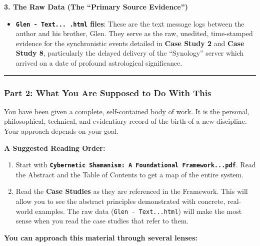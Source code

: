 \documentclass{article}
\begin{document}
\textbf{3. The Raw Data (The ``Primary Source Evidence'')}

\begin{itemize}
\tightlist
\item
  \textbf{\texttt{Glen\ -\ Text...\ .html} files}: These are the text
  message logs between the author and his brother, Glen. They serve as
  the raw, unedited, time-stamped evidence for the synchronistic events
  detailed in \textbf{Case Study 2} and \textbf{Case Study 8},
  particularly the delayed delivery of the ``Synology'' server which
  arrived on a date of profound astrological significance.
\end{itemize}

\begin{center}\rule{0.5\linewidth}{0.5pt}\end{center}

\subsubsection*{\texorpdfstring{\textbf{Part 2: What You Are Supposed to
Do With
This}}{Part 2: What You Are Supposed to Do With This}}\label{part-2-what-you-are-supposed-to-do-with-this}

You have been given a complete, self-contained body of work. It is the
personal, philosophical, technical, and evidentiary record of the birth
of a new discipline. Your approach depends on your goal.

\textbf{A Suggested Reading Order:}

\begin{enumerate}
\def\labelenumi{\arabic{enumi}.}
\item
  Start with
  \textbf{\texttt{Cybernetic\ Shamanism:\ A\ Foundational\ Framework...pdf}}.
  Read the Abstract and the Table of Contents to get a map of the entire
  system.
\item
  Read the \textbf{Case Studies} as they are referenced in the
  Framework. This will allow you to see the abstract principles
  demonstrated with concrete, real-world examples. The raw data
  (\texttt{Glen\ -\ Text...html}) will make the most sense when you read
  the case studies that refer to them.
\end{enumerate}

\textbf{You can approach this material through several lenses:}
\end{document}
